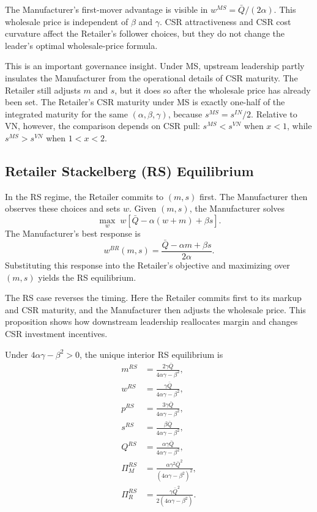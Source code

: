 The Manufacturer's first-mover advantage is visible in $w^{MS}=\bar{Q}/(2\alpha)$. This wholesale price is independent of $\beta$ and $\gamma$. CSR attractiveness and CSR cost curvature affect the Retailer's follower choices, but they do not change the leader's optimal wholesale-price formula.

This is an important governance insight. Under MS, upstream leadership partly insulates the Manufacturer from the operational details of CSR maturity. The Retailer still adjusts $m$ and $s$, but it does so after the wholesale price has already been set. The Retailer's CSR maturity under MS is exactly one-half of the integrated maturity for the same $(\alpha,\beta,\gamma)$, because $s^{MS}=s^{IN}/2$. Relative to VN, however, the comparison depends on CSR pull: $s^{MS}<s^{VN}$ when $x<1$, while $s^{MS}>s^{VN}$ when $1<x<2$.

\subsection{Retailer Stackelberg (RS) Equilibrium}

In the RS regime, the Retailer commits to $(m,s)$ first. The Manufacturer then observes these choices and sets $w$. Given $(m,s)$, the Manufacturer solves
\begin{equation*}
    \max_w\; w\left[\bar{Q}-\alpha(w+m)+\beta s\right].
\end{equation*}
The Manufacturer's best response is
\begin{equation*}
    w^{BR}(m,s)=\frac{\bar{Q}-\alpha m+\beta s}{2\alpha}.
\end{equation*}
Substituting this response into the Retailer's objective and maximizing over $(m,s)$ yields the RS equilibrium.

The RS case reverses the timing. Here the Retailer commits first to its markup and CSR maturity, and the Manufacturer then adjusts the wholesale price. This proposition shows how downstream leadership reallocates margin and changes CSR investment incentives.

\begin{proposition}
\label{prop:rs}
Under $4\alpha\gamma-\beta^2>0$, the unique interior RS equilibrium is
\begin{align*}
    m^{RS} &= \frac{2\gamma\bar{Q}}{4\alpha\gamma-\beta^2},\\
    w^{RS} &= \frac{\gamma\bar{Q}}{4\alpha\gamma-\beta^2},\\
    p^{RS} &= \frac{3\gamma\bar{Q}}{4\alpha\gamma-\beta^2},\\
    s^{RS} &= \frac{\beta\bar{Q}}{4\alpha\gamma-\beta^2},\\
    Q^{RS} &= \frac{\alpha\gamma\bar{Q}}{4\alpha\gamma-\beta^2},\\
    \Pi_M^{RS} &= \frac{\alpha\gamma^2\bar{Q}^2}{(4\alpha\gamma-\beta^2)^2},\\
    \Pi_R^{RS} &= \frac{\gamma\bar{Q}^2}{2(4\alpha\gamma-\beta^2)}.
\end{align*}
\end{proposition}

